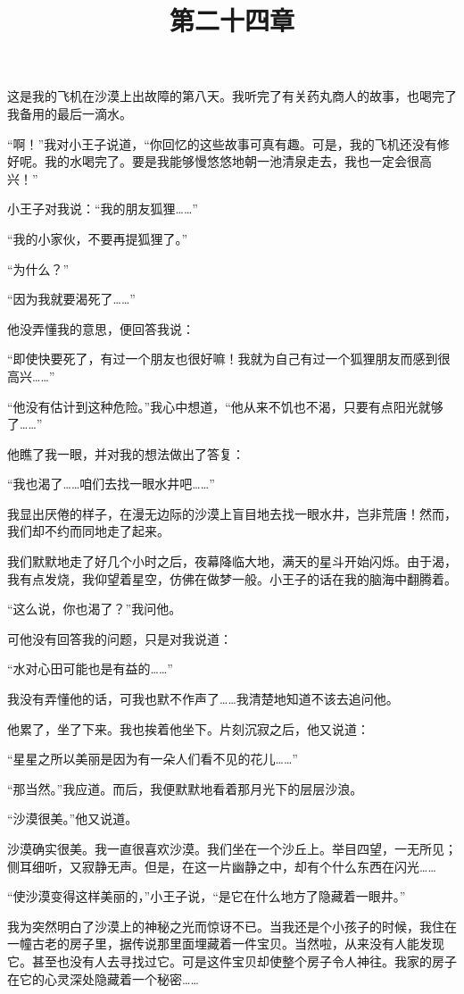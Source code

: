 \title{第二十四章}

这是我的飞机在沙漠上出故障的第八天。我听完了有关药丸商人的故事，也喝完了我备用的最后一滴水。

“啊！”我对小王子说道，“你回忆的这些故事可真有趣。可是，我的飞机还没有修好呢。我的水喝完了。要是我能够慢悠悠地朝一池清泉走去，我也一定会很高兴！”

小王子对我说：“我的朋友狐狸\ldots{}\ldots{}”

“我的小家伙，不要再提狐狸了。”

“为什么？”

“因为我就要渴死了\ldots{}\ldots{}”

他没弄懂我的意思，便回答我说：

“即使快要死了，有过一个朋友也很好嘛！我就为自己有过一个狐狸朋友而感到很高兴\ldots{}\ldots{}”

“他没有估计到这种危险。”我心中想道，“他从来不饥也不渴，只要有点阳光就够了\ldots{}\ldots{}”

他瞧了我一眼，并对我的想法做出了答复：

“我也渴了\ldots{}\ldots{}咱们去找一眼水井吧\ldots{}\ldots{}”

我显出厌倦的样子，在漫无边际的沙漠上盲目地去找一眼水井，岂非荒唐！然而，我们却不约而同地走了起来。

我们默默地走了好几个小时之后，夜幕降临大地，满天的星斗开始闪烁。由于渴，我有点发烧，我仰望着星空，仿佛在做梦一般。小王子的话在我的脑海中翻腾着。

“这么说，你也渴了？”我问他。

可他没有回答我的问题，只是对我说道：

“水对心田可能也是有益的\ldots{}\ldots{}”

我没有弄懂他的话，可我也默不作声了\ldots{}\ldots{}我清楚地知道不该去追问他。

他累了，坐了下来。我也挨着他坐下。片刻沉寂之后，他又说道：

“星星之所以美丽是因为有一朵人们看不见的花儿\ldots{}\ldots{}”

“那当然。”我应道。而后，我便默默地看着那月光下的层层沙浪。

“沙漠很美。”他又说道。

沙漠确实很美。我一直很喜欢沙漠。我们坐在一个沙丘上。举目四望，一无所见；侧耳细听，又寂静无声。但是，在这一片幽静之中，却有个什么东西在闪光\ldots{}\ldots{}

“使沙漠变得这样美丽的，”小王子说，“是它在什么地方了隐藏着一眼井。”

我为突然明白了沙漠上的神秘之光而惊讶不已。当我还是个小孩子的时候，我住在一幢古老的房子里，据传说那里面埋藏着一件宝贝。当然啦，从来没有人能发现它。甚至也没有人去寻找过它。可是这件宝贝却使整个房子令人神往。我家的房子在它的心灵深处隐藏着一个秘密\ldots{}\ldots{}

